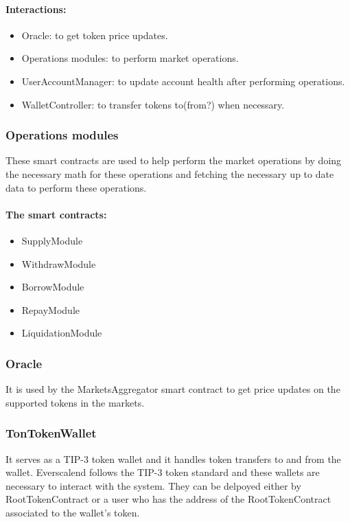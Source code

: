 \paragraph*{Interactions:}
\begin{itemize}
  \item Oracle: to get token price updates.
  \item Operations modules: to perform market operations.
  \item UserAccountManager: to update account health after performing operations.
  \item WalletController: to transfer tokens to(from?) when necessary.
\end{itemize}

\subsubsection{Operations modules}

These smart contracts are used to help perform the market operations by doing the necessary math for these operations and fetching the necessary up to date data to perform these operations.

\paragraph*{The smart contracts:}
\begin{itemize}
  \item SupplyModule
  \item WithdrawModule
  \item BorrowModule
  \item RepayModule
  \item LiquidationModule
\end{itemize}

\subsubsection{Oracle}

It is used by the MarketsAggregator smart contract to get price updates on the supported tokens in the markets.

\subsubsection{TonTokenWallet}

It serves as a TIP-3 token wallet and it handles token transfers to and from the wallet. Everscalend follows the TIP-3 token standard and these wallets are necessary to interact with the system. They can be delpoyed either by RootTokenContract or a user who has the address of the RootTokenContract associated to the wallet's token.

